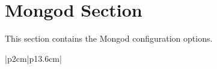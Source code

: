 \documentclass[letterpaper,10pt,english]{sphinxmanual}
\begin{document}
\section{Mongod Section}
\label{\detokenize{operator:operator-mongod-section}}\label{\detokenize{operator:id125}}
This section contains the Mongod configuration options.


\begin{savenotes}\sphinxatlongtablestart\begin{longtable}[c]{|p{2cm}|p{13.6cm}|}
\hline

\endfirsthead

%
{}\\
\hline

\endhead

\hline
{}\\
\endfoot

\endlastfoot


\end{longtable}
\end{savenotes}
\end{document}
